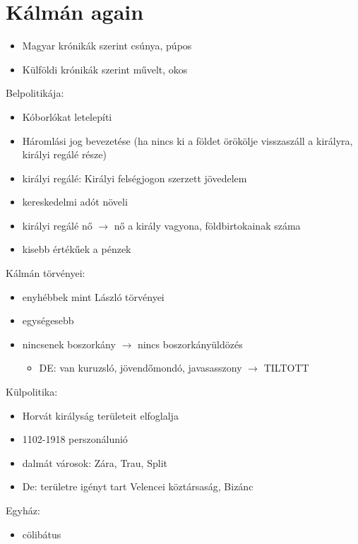 \documentclass{article}
\begin{document}
\section{Kálmán again}
\begin{itemize}
    \item Magyar krónikák szerint csúnya, púpos
    \item Külföldi krónikák szerint művelt, okos
\end{itemize}
Belpolitikája:
\begin{itemize}
    \item Kóborlókat letelepíti
    \item Háromlási jog bevezetése (ha nincs ki a földet örökölje visszaszáll a királyra, királyi regálé része)
    \item királyi regálé: Királyi felségjogon szerzett jövedelem
    \item kereskedelmi adót növeli
    \item királyi regálé nő $\rightarrow$ nő a király vagyona, földbirtokainak száma
    \item kisebb értékűek a pénzek
\end{itemize}
Kálmán törvényei: 
\begin{itemize}
    \item enyhébbek mint László törvényei
    \item egységesebb
    \item nincsenek boszorkány $\rightarrow$ nincs boszorkányüldözés \begin{itemize}
        \item DE: van kuruzsló, jövendőmondó, javasasszony $\rightarrow$ TILTOTT
    \end{itemize}
\end{itemize}
Külpolitika:
\begin{itemize}
    \item Horvát királyság területeit elfoglalja
    \item 1102-1918 perszonálunió
    \item dalmát városok: Zára, Trau, Split
    \item De: területre igényt tart Velencei köztársaság, Bizánc
\end{itemize}

Egyház: 
\begin{itemize}
    \item cölibátus
\end{itemize}
\end{document}
